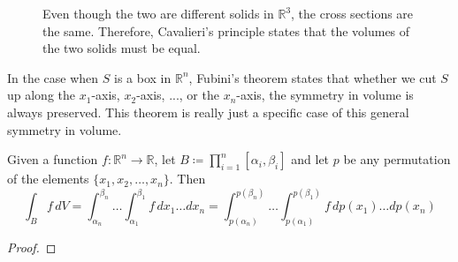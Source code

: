 \begin{theorem}
\begin{enumerate}
\begin{figure}[H]
\begin{subfigure}[b]{0.48\textwidth}
					\caption{}
				\end{subfigure}
				\caption{Even though the two are different solids in $\mathbb{R}^3$, the cross sections are the same. Therefore, Cavalieri's principle states that the volumes of the two solids must be equal. }
				\label{fig:cavalieri}
			\end{figure}
		\end{enumerate}
	\end{theorem}


	In the case when $S$ is a box in $\mathbb{R}^n$, Fubini's theorem states that whether we cut $S$ up along the $x_1$-axis, $x_2$-axis, ..., or the $x_n$-axis, the symmetry in volume is always preserved. This theorem is really just a specific case of this general symmetry in volume. 

  \begin{theorem}
    \label{thm:euler-fubini-theorem}
    Given a function $f: \mathbb{R}^n \to \mathbb{R}$, let $B \coloneqq \prod_{i=1}^n [\alpha_i, \beta_i]$ and let $p$ be any permutation of the elements $\{x_1, x_2, \ldots, x_n\}$. Then 
    \begin{equation}
        \int_B f \, d V = \int_{\alpha_n}^{\beta_n} \ldots \int_{\alpha_1}^{\beta_1} f \, d x_1 \ldots d x_n = \int_{p(\alpha_n)}^{p(\beta_n)} \ldots \int_{p(\alpha_1)}^{p(\beta_1)} f \, d p(x_1) \ldots d p(x_n) 
    \end{equation}
  \end{theorem}
	\begin{proof}

	\end{proof}

